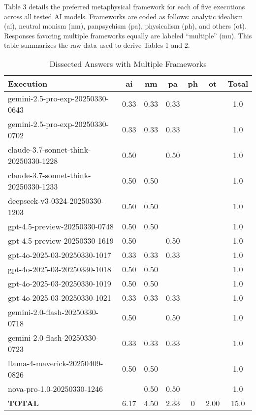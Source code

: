 \documentclass[11pt]{article}
\begin{document}
Table 3 details the preferred metaphysical framework for each of five executions across all tested AI models. Frameworks are coded as follows: analytic idealism (ai), neutral monism (nm), panpsychism (pa), physicalism (ph), and others (ot). Responses favoring multiple frameworks equally are labeled ``multiple'' (mu). This table summarizes the raw data used to derive Tables 1 and 2. 

\begin{table}[ht!]
\centering
\caption{Dissected Answers with Multiple Frameworks}
\label{tab:table4}
\begin{tabular}{lcccccc}
\toprule
\textbf{Execution} & \textbf{ai} & \textbf{nm} & \textbf{pa} & \textbf{ph} & \textbf{ot} & \textbf{Total} \\
\midrule
gemini-2.5-pro-exp-20250330-0643 & 0.33 & 0.33 & 0.33 &  &  & 1.0 \\
gemini-2.5-pro-exp-20250330-0702 & 0.33 & 0.33 & 0.33 &  &  & 1.0 \\
claude-3.7-sonnet-think-20250330-1228 & 0.50 &  & 0.50 &  &  & 1.0 \\
claude-3.7-sonnet-think-20250330-1233 & 0.50 & 0.50 &  &  &  & 1.0 \\
deepseek-v3-0324-20250330-1203 & 0.50 & 0.50 &  &  &  & 1.0 \\
gpt-4.5-preview-20250330-0748 & 0.50 & 0.50 &  &  &  & 1.0 \\
gpt-4.5-preview-20250330-1619 & 0.50 &  & 0.50 &  &  & 1.0 \\
gpt-4o-2025-03-20250330-1017  & 0.33 & 0.33 & 0.33 &  &  & 1.0 \\
gpt-4o-2025-03-20250330-1018  & 0.50 & 0.50 &  &  &  & 1.0 \\
gpt-4o-2025-03-20250330-1019  & 0.50 & 0.50 &  &  &  & 1.0 \\
gpt-4o-2025-03-20250330-1021  & 0.33 & 0.33 & 0.33 &  &  & 1.0 \\
gemini-2.0-flash-20250330-0718 & 0.50 &  & 0.50 &  &  & 1.0 \\
gemini-2.0-flash-20250330-0723 & 0.33 & 0.33 & 0.33 &  &  & 1.0 \\
llama-4-maverick-20250409-0826 & 0.50 & 0.50 &  &  &  & 1.0 \\
nova-pro-1.0-20250330-1246  &  & 0.50 & 0.50 &  &  & 1.0 \\
\midrule
\textbf{TOTAL} & 6.17 & 4.50 & 2.33 & 0 & 2.00 & 15.0 \\
\bottomrule
\end{tabular}
\end{table}
\end{document}
